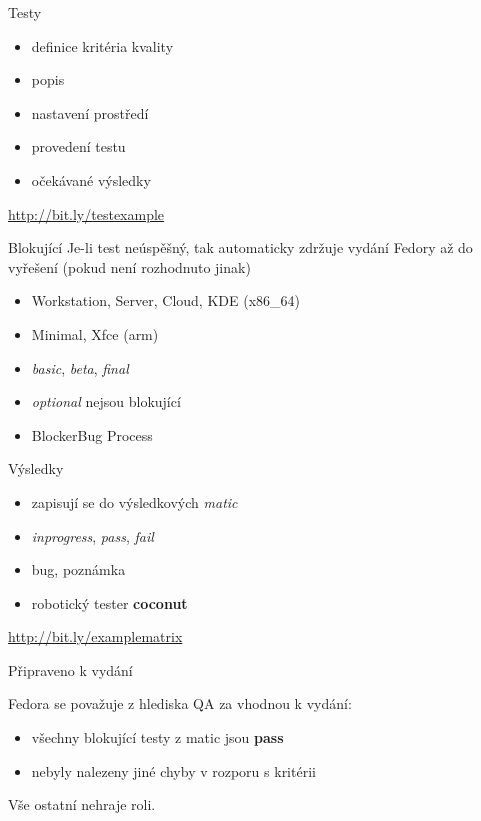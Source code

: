 \documentclass[12pt,aspectratio=169]{beamer}
\begin{document}
\begin{frame}{Testy}
	\begin{itemize}
		\item definice kritéria kvality
		\item popis
		\item nastavení prostředí
		\item provedení testu
		\item očekávané výsledky
	\end{itemize}

	\vspace{10pt}

{\small \url{http://bit.ly/testexample}}
\end{frame}

\begin{frame}{Blokující}
	Je-li test neúspěšný, tak automaticky zdržuje vydání Fedory až do vyřešení (pokud není rozhodnuto jinak)
		
	\vspace{10pt}
	
	\begin{itemize}
		\item Workstation, Server, Cloud, KDE (x86\_64)
		\item Minimal, Xfce (arm)
		\item \textit{basic}, \textit{beta}, \textit{final}
		\item \textit{optional} nejsou blokující
		\item BlockerBug Process
	\end{itemize}
\end{frame}

\begin{frame}{Výsledky}
	\begin{itemize}
		\item zapisují se do výsledkových \textit{matic}
		\item \textit{inprogress}, \textit{pass}, \textit{fail}
		\item bug, poznámka
		\item robotický tester \textbf{coconut}
	\end{itemize}

	\vspace{10pt}

{\small \url{http://bit.ly/examplematrix}}
\end{frame}

\begin{frame}{Připraveno k vydání}
	
	Fedora se považuje z hlediska QA za vhodnou k vydání:
	
	\vspace{10pt}
	
	\begin{itemize}
		\item všechny blokující testy z matic jsou \textbf{pass}
		\item nebyly nalezeny jiné chyby v rozporu s kritérii
	\end{itemize}

	\vspace{10pt}

	Vše ostatní nehraje roli.
\end{frame}
\end{document}
